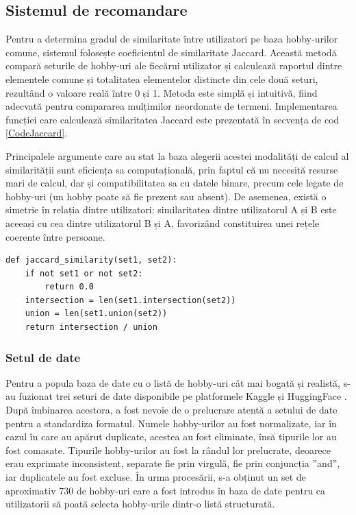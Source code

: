\subsection{Sistemul de recomandare}
\label{subsec:ch4sec1sub3}
Pentru a determina gradul de similaritate între utilizatori pe baza hobby-urilor comune, sistemul folosește coeficientul de similaritate Jaccard.
Această metodă compară seturile de hobby-uri ale fiecărui utilizator și calculează raportul dintre elementele comune și totalitatea elementelor distincte din cele două seturi, rezultând o valoare reală între 0 și 1.
Metoda este simplă și intuitivă, fiind adecvată pentru compararea mulțimilor neordonate de termeni.
Implementarea funcției care calculează similaritatea Jaccard este prezentată în secvența de cod \ref{CodeJaccard}.
\par
Principalele argumente care au stat la baza alegerii acestei modalități de calcul al similarității sunt eficiența sa computațională, prin faptul că nu necesită resurse mari de calcul, dar și compatibilitatea sa cu datele binare, precum cele legate de hobby-uri (un hobby poate să fie prezent sau absent).
De asemenea, există o simetrie în relația dintre utilizatori: similaritatea dintre utilizatorul A și B este aceeași cu cea dintre utilizatorul B și A, favorizând constituirea unei rețele coerente între persoane.

\begin{lstlisting}[caption={Algoritmul de calcul al similarității Jaccard}, label={CodeJaccard}]
def jaccard_similarity(set1, set2):
    if not set1 or not set2:
        return 0.0
    intersection = len(set1.intersection(set2))
    union = len(set1.union(set2))
    return intersection / union
\end{lstlisting}    

\subsubsection*{Setul de date}
Pentru a popula baza de date cu o listă de hobby-uri cât mai bogată și realistă, s-au fuzionat trei seturi de date disponibile pe platformele Kaggle \cite{kaggle_Raj, kaggle_dawid} și HuggingFace \cite{hf_Ugurcan}.
După îmbinarea acestora, a fost nevoie de o prelucrare atentă a setului de date pentru a standardiza formatul.
Numele hobby-urilor au fost normalizate, iar în cazul în care au apărut duplicate, acestea au fost eliminate, însă tipurile lor au fost comasate.
Tipurile hobby-urilor au fost la rândul lor prelucrate, deoarece erau exprimate inconsistent, separate fie prin virgulă, fie prin conjuncția ”and”, iar duplicatele au fost excluse.
În urma procesării, s-a obținut un set de aproximativ 730 de hobby-uri care a fost introdus în baza de date pentru ca utilizatorii să poată selecta hobby-urile dintr-o listă structurată.

